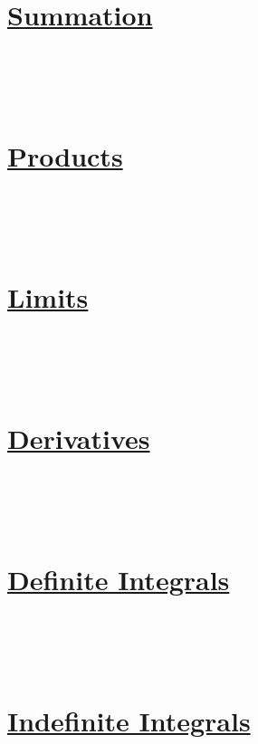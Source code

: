 \documentclass[12pt]{article}
\begin{document}
\section*{\underline{Summation}}
\textbf{}
    \\
\\ \textbf{}
    \\



\section*{\underline{Products}}
\textbf{}
    \\
\\ \textbf{}
    \\



\section*{\underline{Limits}}
\textbf{}
    \\
\\ \textbf{}
    \\



\section*{\underline{Derivatives}}
\textbf{}
    \\
\\ \textbf{}
    \\



\section*{\underline{Definite Integrals}}
\textbf{}
    \\
\\ \textbf{}
    \\



\section*{\underline{Indefinite Integrals}}
\textbf{}
    \\
\\ \textbf{}
    \\
\end{document}

